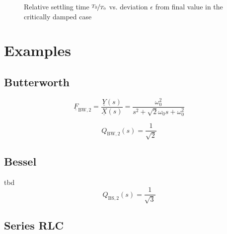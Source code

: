 \documentclass{article}[11pt]
\begin{document}
\begin{figure}[H]
  \centering
  \caption{Relative settling time $\nicefrac{T_{\mathrm{S}}}{T_{\mathrm{0}}}$
    vs. deviation $\epsilon$ from final value in the critically damped case}
  \label{fig:settling-crit-damped}
\end{figure}

\section{Examples}\label{sec:examples}

\subsection{Butterworth}\label{subsec:examples:butterworth}

\begin{equation}
\underline{F}_{\mathrm{BW,2}} = \frac{\underline{Y}(s)}{\underline{X}(s)} 
                 = \frac{\omega_0^2}{s^2 + \sqrt{2} \omega_0 s + \omega_0^2 }
\end{equation}

\begin{equation}
Q_{\mathrm{BW,2}}(s) = \frac{1}{\sqrt{2}}
\end{equation}

\subsection{Bessel}
tbd
\begin{equation}
Q_{\mathrm{BS,2}}(s) = \frac{1}{\sqrt{3}}
\end{equation}
\subsection{Series RLC}
\end{document}
